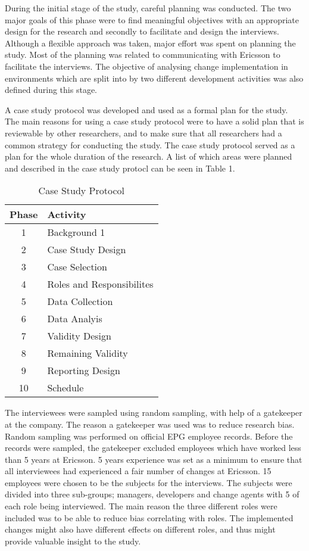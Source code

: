 \documentclass[10pt,twocolumn]{article}
\begin{document}
During the initial stage of the study, careful planning was conducted. The two major goals of this phase were to find meaningful objectives with an appropriate design for the research and secondly to facilitate and design the interviews. Although a flexible approach was taken, major effort was spent on planning the study. Most of the planning was related to communicating with Ericsson to facilitate the interviews. The objective of analysing change implementation in environments which are split into by two different development activities was also defined during this stage.


A case study protocol \cite{brereton2008using} was developed and used as a formal plan for the study. The main reasons for using a case study protocol were to have a solid plan that is reviewable by other researchers, and to make sure that all researchers had a common strategy for conducting the study. The case study protocol served as a plan for the whole duration of the research. A list of which areas were planned and described in the case study protocl can be seen in Table 1. 

\begin{table}
	\centering
	\begin{tabular}[Ht]{|c|l|}
	\hline
	\textbf{Phase} & \textbf{Activity}\\
	\hline
	1 & Background 1\\
	\hline
	2 & Case Study Design \\
	\hline
	3 & Case Selection \\
	\hline
	4 & Roles and Responsibilites \\
	\hline
	5 & Data Collection \\
	\hline
	6 & Data Analyis \\
	\hline
	7 & Validity Design \\
	\hline
	8 & Remaining Validity \\
	\hline
	9 & Reporting Design \\
	\hline
	10 & Schedule \\
	\hline


	\end{tabular}
	\caption{Case Study Protocol}
\end{table}



The interviewees were sampled using random sampling, with help of a gatekeeper at the company. The reason a gatekeeper was used was to reduce research bias. Random sampling was performed on official EPG employee records. Before the records were sampled, the gatekeeper excluded employees which have worked less than 5 years at Ericsson. 5 years experience was set as a minimum to ensure that all interviewees had experienced a fair number of changes at Ericsson. 15 employees were chosen to be the subjects for the interviews. The subjects were divided into three sub-groups; managers, developers and change agents with 5 of each role being interviewed. The main reason the three different roles were included was to be able to reduce bias correlating with roles. The implemented changes might also have different effects on different roles, and thus might provide valuable insight to the study.
\end{document}

